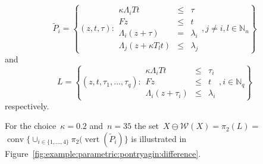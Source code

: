 \documentclass[smallextended]{svjour3}       %
\numberwithin{equation}{section}
\DeclareMathOperator{\vertices}{vert}
\DeclareMathOperator*{\conv}{conv}
\begin{document}
$$
\tilde P_i= \left\{(z,t,\tau): \begin{array}{rcl}\kappa\Lambda_i Tt &\leq& \tau\\ Fz&\leq& t\\ \Lambda_i(z+\tau)&=&\lambda_i\\ \Lambda_j(z+\kappa T_lt)&\leq&\lambda_j\end{array},j\neq i,l\in\mathbb N_n\right\}
$$
%
and
$$
L = \left\{(z,t,\tau_1,\dots,\tau_q):\begin{array}{rcl}
\kappa\Lambda_i Tt & \leq &\tau_i\\
Fz &\leq& t\\
\Lambda_i(z+\tau_i)&\leq&\lambda_i
\end{array},i\in\mathbb N_q\right\}
$$
%
respectively.

For the choice~$\kappa=0.2$ and~$n = 35$ the set~$X\ominus\mathcal W(X)=\pi_2(L)=$\linebreak $\conv\{\cup_{i\in\{1,\dots,4\}}\pi_2(\vertices(\tilde P_i)\}$ is illustrated in Figure~\ref{fig:example:parametric:pontryagin:difference}.
\end{document}
